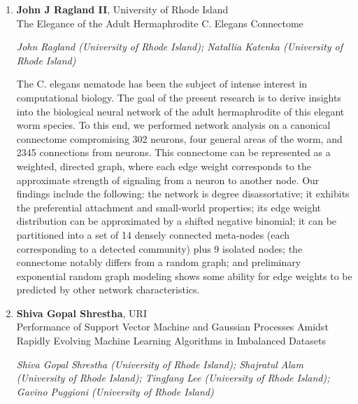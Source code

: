 \begin{enumerate}
\item \textbf{John J Ragland II}, University of Rhode Island \\
The Elegance of the Adult Hermaphrodite C. Elegans Connectome

\emph{\footnotesize John Ragland (University of Rhode Island); Natallia Katenka (University of Rhode Island)}

The C. elegans nematode has been the subject of intense interest in computational biology. The goal of the present research is to derive insights into the biological neural network of the adult hermaphrodite of this elegant worm species. To this end, we performed network analysis on a canonical connectome compromising 302 neurons, four general areas of the worm, and 2345 connections from neurons. This connectome can be represented as a weighted, directed graph, where each edge weight corresponds to the approximate strength of signaling from a neuron to another node. Our findings include the following: the network is degree disassortative; it exhibits the preferential attachment and small-world properties; its edge weight distribution can be approximated by a shifted negative binomial; it can be partitioned into a set of 14 densely connected meta-nodes (each corresponding to a detected community) plus 9 isolated nodes; the connectome notably differs from a random graph; and preliminary exponential random graph modeling shows some ability for edge weights to be predicted by other network characteristics.

\item \textbf{Shiva Gopal Shrestha}, URI \\
Performance of Support Vector Machine  and Gaussian Processes Amidst Rapidly Evolving  Machine Learning Algorithms in Imbalanced Datasets

\emph{\footnotesize Shiva Gopal Shrestha (University of Rhode Island); Shajratul Alam (University of Rhode Island); Tingfang Lee (University of Rhode Island); Gavino Puggioni (University of Rhode Island)}


\end{enumerate}
